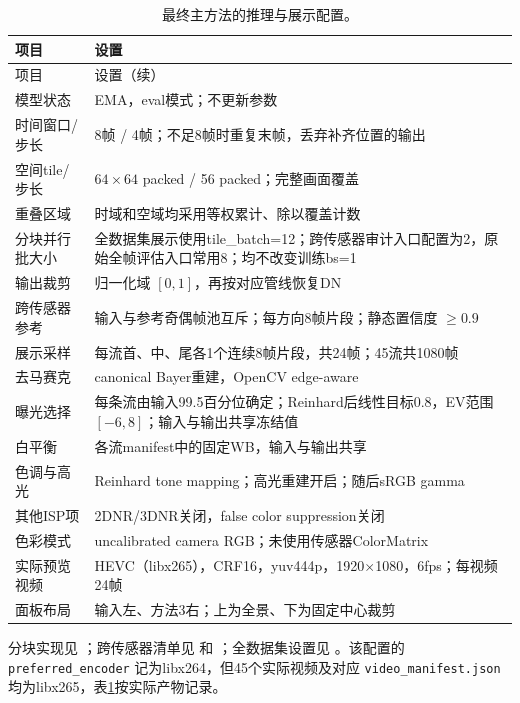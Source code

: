 \begin{longtable}{p{}p{}}
\caption{最终主方法的推理与展示配置。}\label{tab:inference_config}\\
\toprule 项目 & 设置 \\ \midrule
\endfirsthead
\toprule 项目 & 设置（续） \\ \midrule
\endhead
\bottomrule\endfoot
模型状态 & EMA，eval模式；不更新参数 \\
时间窗口/步长 & 8帧 / 4帧；不足8帧时重复末帧，丢弃补齐位置的输出 \\
空间tile/步长 & $64\times64$ packed / 56 packed；完整画面覆盖 \\
重叠区域 & 时域和空域均采用等权累计、除以覆盖计数 \\
分块并行批大小 & 全数据集展示使用tile\_batch=12；跨传感器审计入口配置为2，原始全帧评估入口常用8；均不改变训练bs=1 \\
输出裁剪 & 归一化域 $[0,1]$，再按对应管线恢复DN \\
跨传感器参考 & 输入与参考奇偶帧池互斥；每方向8帧片段；静态置信度 $\ge0.9$ \\
展示采样 & 每流首、中、尾各1个连续8帧片段，共24帧；45流共1080帧 \\
去马赛克 & canonical Bayer重建，OpenCV edge-aware \\
曝光选择 & 每条流由输入99.5百分位确定；Reinhard后线性目标0.8，EV范围 $[-6,8]$；输入与输出共享冻结值 \\
白平衡 & 各流manifest中的固定WB，输入与输出共享 \\
色调与高光 & Reinhard tone mapping；高光重建开启；随后sRGB gamma \\
其他ISP项 & 2DNR/3DNR关闭，false color suppression关闭 \\
色彩模式 & uncalibrated camera RGB；未使用传感器ColorMatrix \\
实际预览视频 & HEVC（libx265），CRF16，yuv444p，1920$\times$1080，6fps；每视频24帧 \\
面板布局 & 输入左、方法3右；上为全景、下为固定中心裁剪 \\
\end{longtable}

分块实现见 ；跨传感器清单见  和 ；全数据集设置见 。该配置的 \texttt{preferred\_encoder} 记为libx264，但45个实际视频及对应 \texttt{video\_manifest.json} 均为libx265，表\ref{tab:inference_config}按实际产物记录。


